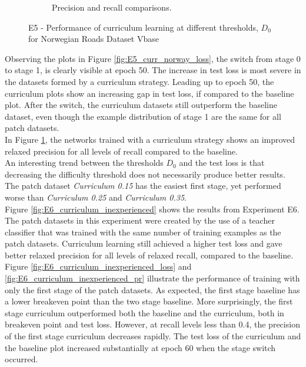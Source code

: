 \begin{figure}[h]
\begin{subfigure}{0.5\textwidth}
\caption{Precision and recall comparisons.} \label{fig:E5_curr_norway_pr}
\end{subfigure}
\hspace*{\fill} %
\caption[E5 - Performance of curriculum learning for Norwegian Roads Dataset Vbase]{E5 - Performance of curriculum learning at different thresholds, $D_{0}$ for Norwegian Roads Dataset Vbase} \label{fig:E5_curriculum_norway}
\end{figure}

Observing the plots in Figure \ref{fig:E5_curr_norway_loss}, the switch from stage 0 to stage 1, is clearly visible at epoch 50. The increase in test loss is most severe in the datasets formed by a curriculum strategy. Leading up to epoch 50, the curriculum plots show an increasing gap in test loss, if compared to the baseline plot. After the switch, the curriculum datasets still outperform the baseline dataset, even though the example distribution of stage 1 are the same for all patch datasets.\\

In Figure \ref{fig:E5_curr_norway_pr}, the networks trained with a curriculum strategy shows  an improved relaxed precision for all levels of recall compared to the baseline.\\

An interesting trend between the thresholds $D_0$ and the test loss is that decreasing the difficulty threshold does not necessarily produce better results. The patch dataset \textit{Curriculum 0.15} has the easiest first stage, yet performed worse than \textit{Curriculum 0.25} and \textit{Curriculum 0.35}.\\

Figure \ref{fig:E6_curriculum_inexperienced} shows the results from Experiment E6. The patch datasets in this experiment were created by the use of a teacher classifier that was trained with the same number of training examples as the patch datasets. Curriculum learning still achieved a higher test loss and gave better relaxed precision for all levels of relaxed recall, compared to the baseline.\\

Figure \ref{fig:E6_curriculum_inexperienced_loss} and \ref{fig:E6_curriculum_inexperienced_pr} illustrate  the performance of training with only the first stage of the patch datasets. As expected, the first stage baseline has a lower breakeven point than the two stage baseline. More surprisingly, the first stage curriculum outperformed both the baseline and the curriculum, both in breakeven point and test loss. However, at recall levels less than 0.4, the precision of the first stage curriculum decreases rapidly. The test loss of the curriculum and the baseline plot  increased substantially at epoch 60 when the stage switch occurred. \\

